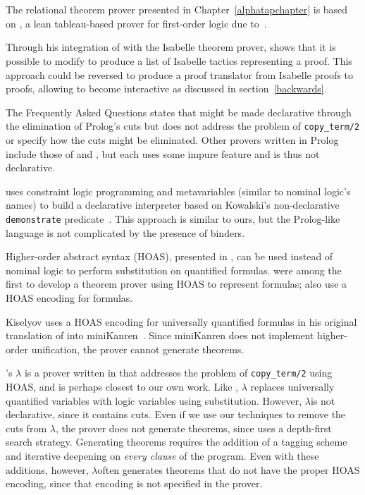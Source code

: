 \section{\alphatap}\label{alphataprelated}

The \alphatapsp relational theorem prover presented in
Chapter~\ref{alphatapchapter} is based on \leantap, a lean
tableau-based prover for first-order logic due
to~\citet{beckert95leantap}.

Through his integration of \leantapsp with the Isabelle theorem
prover, \citet{paulson99generic} shows that it is possible to
modify \leantapsp to produce a list of Isabelle tactics representing a
proof.  This approach could be reversed to produce a proof translator
from Isabelle proofs to \alphatapsp proofs, allowing \alphatapsp to
become interactive as discussed in section~\ref{backwards}.

The \leantapsp Frequently Asked Questions
\cite{beckert-leantsupsuppfaq} states that \leantapsp might be made
declarative through the elimination of Prolog's cuts but does not
address the problem of \mbox{\texttt{copy\_term/2}} or specify how the cuts
might be eliminated.  Other provers written in Prolog include those of
\citet{manthey1988stp} and \citet{stickel1988ptt}, but each uses some
impure feature and is thus not declarative.

\citet{christiansen1998arc} uses constraint logic programming and
metavariables (similar to nominal logic's names) to build a
declarative interpreter based on Kowalski's non-declarative
\texttt{demonstrate} predicate~\cite{kowalski79}.  This approach is
similar to ours, but the Prolog-like language is not complicated by
the presence of binders.

Higher-order abstract syntax (HOAS), presented in
\citet{pfenning1988hoa}, can be used instead of nominal logic to
perform substitution on quantified formulas. \citet{felty1988stp} were
among the first to develop a theorem prover using HOAS to represent
formulas; \citet{pfenning1999sdt} also use a HOAS encoding for
formulas.

Kiselyov uses a HOAS encoding for universally quantified formulas in
his original translation of \leantapsp into
miniKanren~\cite{kanrensite}. Since miniKanren does not implement
higher-order unification, the prover cannot generate theorems.

\citeauthor{lisitsalambdald}'s $\lambda$\leantapsp
\citeyearpar{lisitsalambdald} is a prover written in \lambdaprologsp
that addresses the problem of \mbox{\texttt{copy\_term/2}} using HOAS, and is
perhaps closest to our own work.  Like \alphatap, $\lambda$\leantapsp
replaces universally quantified variables with logic variables using
substitution. However, $\lambda$\leantapsp is not declarative, since
it contains cuts.  Even if we use our techniques to remove the cuts
from $\lambda$\leantap, the prover does not generate theorems, since
\lambdaprologsp uses a depth-first search strategy.  Generating
theorems requires the addition of a tagging scheme and iterative
deepening on \emph{every clause} of the program.  Even with these
additions, however, $\lambda$\leantapsp often generates theorems that
do not have the proper HOAS encoding, since that encoding is not
specified in the prover.

